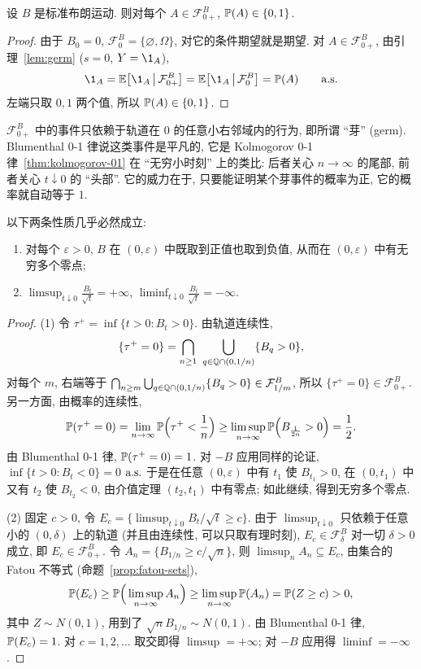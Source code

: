 \begin{theorem}[Blumenthal 0-1 律]\label{thm:blumenthal}
设 $B$ 是标准布朗运动. 则对每个 $A\in\mathcal{F}^B_{0+}$, $\P(A)\in\{0,1\}$.
\end{theorem}

\begin{proof}
由于 $B_0=0$, $\mathcal{F}^B_0=\{\varnothing,\Omega\}$, 对它的条件期望就是期望. 对 $A\in\mathcal{F}^B_{0+}$, 由引理~\ref{lem:germ} ($s=0$, $Y=\1_A$),
\[
\1_A=\E\big[\1_A\,\big|\,\mathcal{F}^B_{0+}\big]=\E\big[\1_A\,\big|\,\mathcal{F}^B_0\big]=\P(A)\qquad\as
\]
左端只取 $0,1$ 两个值, 所以 $\P(A)\in\{0,1\}$.
\end{proof}

$\mathcal{F}^B_{0+}$ 中的事件只依赖于轨道在 $0$ 的任意小右邻域内的行为, 即所谓 ``芽'' (germ). Blumenthal 0-1 律说这类事件是平凡的, 它是 Kolmogorov 0-1 律~\ref{thm:kolmogorov-01} 在 ``无穷小时刻'' 上的类比: 后者关心 $n\to\infty$ 的尾部, 前者关心 $t\downarrow0$ 的 ``头部''. 它的威力在于, 只要能证明某个芽事件的概率为正, 它的概率就自动等于 $1$.

\begin{corollary}[布朗运动在起点附近的振荡]\label{cor:bm-germ}
以下两条性质几乎必然成立:
\begin{enumerate}
\item 对每个 $\varepsilon>0$, $B$ 在 $(0,\varepsilon)$ 中既取到正值也取到负值, 从而在 $(0,\varepsilon)$ 中有无穷多个零点;
\item $\limsup_{t\downarrow0}\frac{B_t}{\sqrt{t}}=+\infty$, $\liminf_{t\downarrow0}\frac{B_t}{\sqrt{t}}=-\infty$.
\end{enumerate}
\end{corollary}

\begin{proof}
(1) 令 $\tau^+=\inf\{t>0: B_t>0\}$. 由轨道连续性,
\[
\{\tau^+=0\}=\bigcap_{n\ge1}\ \bigcup_{q\in\Q\cap(0,1/n)}\{B_q>0\},
\]
对每个 $m$, 右端等于 $\bigcap_{n\ge m}\bigcup_{q\in\Q\cap(0,1/n)}\{B_q>0\}\in\mathcal{F}^B_{1/m}$, 所以 $\{\tau^+=0\}\in\mathcal{F}^B_{0+}$. 另一方面, 由概率的连续性,
\[
\P(\tau^+=0)=\lim_{n\to\infty}\P\Big(\tau^+<\frac{1}{n}\Big)\ge\limsup_{n\to\infty}\P\Big(B_{\frac{1}{2n}}>0\Big)=\frac{1}{2}.
\]
由 Blumenthal 0-1 律, $\P(\tau^+=0)=1$. 对 $-B$ 应用同样的论证, $\inf\{t>0:B_t<0\}=0$ $\as$ 于是在任意 $(0,\varepsilon)$ 中有 $t_1$ 使 $B_{t_1}>0$, 在 $(0,t_1)$ 中又有 $t_2$ 使 $B_{t_2}<0$, 由介值定理 $(t_2,t_1)$ 中有零点; 如此继续, 得到无穷多个零点.

(2) 固定 $c>0$, 令 $E_c=\{\limsup_{t\downarrow0}B_t/\sqrt{t}\ge c\}$. 由于 $\limsup_{t\downarrow0}$ 只依赖于任意小的 $(0,\delta)$ 上的轨道 (并且由连续性, 可以只取有理时刻), $E_c\in\mathcal{F}^B_\delta$ 对一切 $\delta>0$ 成立, 即 $E_c\in\mathcal{F}^B_{0+}$. 令 $A_n=\{B_{1/n}\ge c/\sqrt{n}\}$, 则 $\limsup_nA_n\subseteq E_c$, 由集合的 Fatou 不等式 (命题~\ref{prop:fatou-sets}),
\[
\P(E_c)\ge\P\Big(\limsup_{n\to\infty}A_n\Big)\ge\limsup_{n\to\infty}\P(A_n)=\P(Z\ge c)>0,
\]
其中 $Z\sim N(0,1)$, 用到了 $\sqrt{n}B_{1/n}\sim N(0,1)$. 由 Blumenthal 0-1 律, $\P(E_c)=1$. 对 $c=1,2,\dots$ 取交即得 $\limsup=+\infty$; 对 $-B$ 应用得 $\liminf=-\infty$.
\end{proof}

